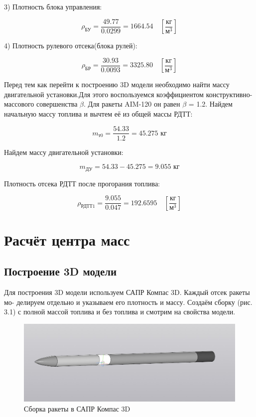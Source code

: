 \documentclass[a4paper,12pt]{report}
\begin{document}
3) Плотность блока управления:

\[ \rho_{\text{БУ}} = \frac{49.77}{0.0299} = 1664.54 \quad \left[\frac{\text{кг}}{\text{м}^3}\right]\]

4) Плотность рулевого отсека(блока рулей):

\[ \rho_{\text{БР}} = \frac{30.93}{0.0093} = 3325.80 \quad \left[\frac{\text{кг}}{\text{м}^3}\right]\]

Перед тем как перейти к построению 3D модели необходимо найти массу двигательной установки.Для этого воспользуемся коэффициентом конструктивно-массового совершенства $\beta$.
Для ракеты AIM-120 он равен $\beta$ = 1.2. Найдем начальную массу топлива и вычтем её из общей массы РДТТ:

\[ m_{\text{т0}} = \frac{54.33}{1.2}=45.275 {\text{ кг}}\]

Найдем массу двигательной установки:

\[ m_{\text{ДУ}} = 54.33-45.275=9.055 {\text{ кг}}\]

Плотность отсека РДТТ после прогорания топлива:

\[ \rho_{\text{РДТТ1}} = \frac{9.055}{0.047} = 192.6595 \quad \left[\frac{\text{кг}}{\text{м}^3}\right]\]

\chapter{Расчёт центра масс}

\section{Построение 3D модели}

Для построения 3D модели используем САПР Компас 3D. Каждый отсек ракеты мо-
делируем отдельно и указываем его плотность и массу. Создаём сборку (рис. 3.1) с полной
массой топлива и без топлива и смотрим на свойства модели.

\begin{figure}[h]
\centering
\includegraphics[width=0.65\textheight]{images/6.jpg}
\caption{Сборка ракеты в САПР Компас 3D}
\label{AIM-120}
\end{figure}
\end{document}

